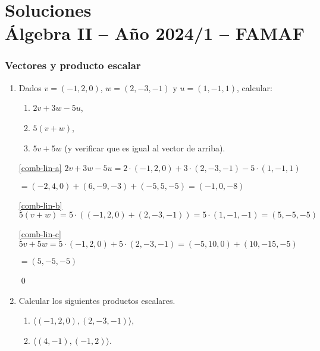 \chapter{Soluciones\\Álgebra  II -- Año 2024/1 -- FAMAF}\label{practico-1}
    


\subsection*{Vectores y producto escalar}

\begin{enumerate}[topsep=6pt, itemsep=.4cm]


    \item Dados $v = (-1, 2, 0)$, $w = (2,-3,-1)$ y $u = (1,-1,1)$, calcular:
    \begin{enumerate}
        \item\label{comb-lin-a} $2v + 3w -5u$,
        \item\label{comb-lin-b} $5(v+w)$,
        \item\label{comb-lin-c} $5v + 5w$ (y verificar que es igual al vector de arriba).
    \end{enumerate}

\rta

\noindent  \ref{comb-lin-a} $2v + 3w -5u = 2 \cdot (-1, 2, 0) + 3 \cdot (2,-3,-1) - 5 \cdot (1,-1,1) $

$ = (-2, 4, 0) + (6,-9,-3) + (-5,5,-5) = \boxed{(-1,0,-8)}$

\noindent\ref{comb-lin-b} $5(v+w) = 5 \cdot ( (-1, 2, 0) + (2,-3,-1) ) = 5 \cdot (1,-1,-1) = \boxed{(5,-5,-5)} $


\noindent\ref{comb-lin-c} $5v + 5w = 5 \cdot (-1, 2, 0) + 5 \cdot (2,-3,-1) = (-5, 10, 0) + (10,-15,-5)$

$= \boxed{(5,-5,-5)}$


\qed


\item Calcular los siguientes productos escalares. %
\begin{enumerate}
  \item\label{prod-esc-a} $\langle (-1, 2, 0) ,(2,-3,-1) \rangle$,
  \item\label{prod-esc-b}  $\langle (4,-1),(-1,2) \rangle$.
\end{enumerate}


\end{enumerate}
